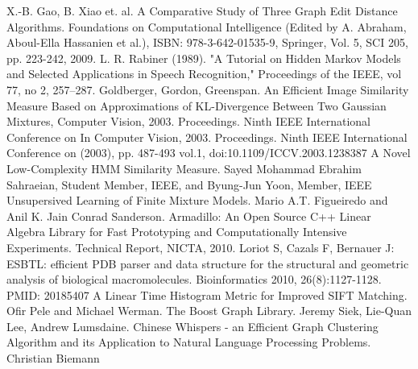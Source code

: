 \documentclass{DEarticle}
\begin{document}
\begin{thebibliography}{1}
 X.-B. Gao, B. Xiao et. al. A Comparative Study of Three Graph Edit Distance Algorithms. Foundations on Computational Intelligence (Edited by A. Abraham, Aboul-Ella Hassanien et al.), ISBN: 978-3-642-01535-9, Springer, Vol. 5, SCI 205, pp. 223-242, 2009. 
 L. R. Rabiner (1989). "A Tutorial on Hidden Markov Models and Selected Applications in Speech Recognition," Proceedings of the IEEE, vol 77, no 2, 257--287.
 Goldberger, Gordon, Greenspan. An Efficient Image Similarity Measure Based on Approximations of KL-Divergence Between Two Gaussian Mixtures, Computer Vision, 2003. Proceedings. Ninth IEEE International Conference on In Computer Vision, 2003. Proceedings. Ninth IEEE International Conference on (2003), pp. 487-493 vol.1, doi:10.1109/ICCV.2003.1238387 
 A Novel Low-Complexity HMM Similarity Measure. Sayed Mohammad Ebrahim Sahraeian, Student Member, IEEE, and Byung-Jun Yoon, Member, IEEE
 Unsupersived Learning of Finite Mixture Models. Mario A.T. Figueiredo and Anil K. Jain
 Conrad Sanderson. Armadillo: An Open Source C++ Linear Algebra Library for Fast Prototyping and Computationally Intensive Experiments. Technical Report, NICTA, 2010.
 Loriot S, Cazals F, Bernauer J: ESBTL: efficient PDB parser and data structure for the structural and geometric analysis of biological macromolecules. Bioinformatics 2010, 26(8):1127-1128. PMID: 20185407
 A Linear Time Histogram Metric for Improved SIFT Matching. Ofir Pele and Michael Werman. 
 The Boost Graph Library. Jeremy Siek, Lie-Quan Lee, Andrew Lumsdaine.
 Chinese Whispers - an Efficient Graph Clustering Algorithm and its Application to Natural Language
Processing Problems. Christian Biemann 

\end{thebibliography}
\end{document}
